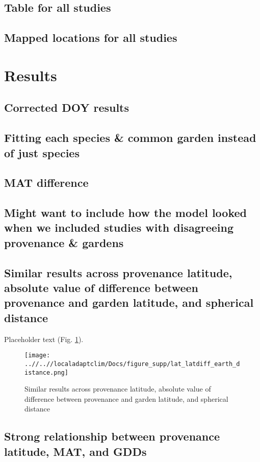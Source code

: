 \documentclass{article}
\begin{document}
\subsection*{Table for all studies}
\subsection*{Mapped locations for all studies}

\section*{Results}




\subsection*{Corrected DOY results}
\subsection*{Fitting each species \& common garden instead of just species}
\subsection*{MAT difference}
\subsection*{Might want to include how the model looked when we included studies with disagreeing provenance \& gardens}


\subsection*{Similar results across provenance latitude, absolute value of difference between provenance and garden latitude, and spherical distance}
Placeholder text (Fig. \ref{figure:lat_distance}).
\begin{figure}[!h] 
    \centering
 \texttt{[image: ..//..//localadaptclim/Docs/figure\_supp/lat\_latdiff\_earth\_distance.png]}
    \caption{Similar results across provenance latitude, absolute value of difference between provenance and garden latitude, and spherical distance}
    \label{figure:lat_distance}
\end{figure}

\subsection* {Strong relationship between provenance latitude, MAT, and GDDs}
\end{document}

